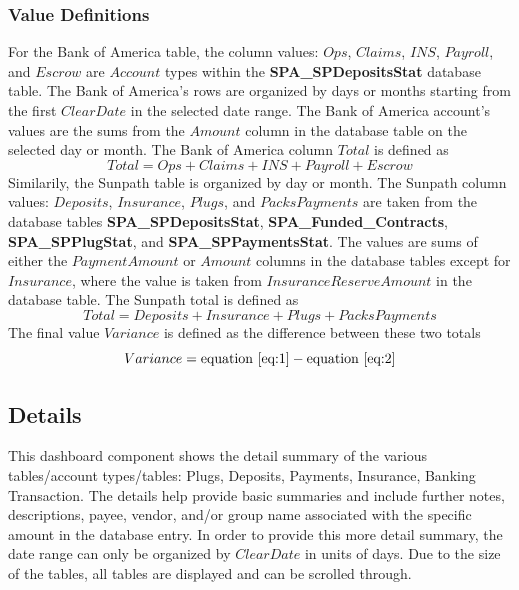 \documentclass[titlepage]{article}
\begin{document}
\subsubsection{Value Definitions}
For the Bank of America table, the column values: $Ops$, $Claims$, $INS$, $Payroll$, and $Escrow$ are $Account$ types within the \textbf{SPA\_SPDepositsStat} database table. The Bank of America's rows are organized by days or months starting from the first $Clear Date$ in the selected date range. The Bank of America account's values are the sums from the $Amount$ column in the database table on the selected day or month. The Bank of America column $Total$ is defined as 
\begin{equation} \label{eq:1}
Total = Ops + Claims + INS + Payroll + Escrow
\end{equation}
Similarily, the Sunpath table is organized by day or month. The Sunpath column values: $Deposits$, $Insurance$, $Plugs$, and $PacksPayments$ are taken from the database tables \textbf{SPA\_SPDepositsStat}, \textbf{SPA\_Funded\_Contracts}, \textbf{SPA\_SPPlugStat}, and \textbf{SPA\_SPPaymentsStat}. The values are sums of either the $PaymentAmount$ or $Amount$ columns in the database tables except for $Insurance$, where the value is taken from $InsuranceReserveAmount$ in the database table. The Sunpath total is defined as 
\begin{equation}\label{eq:2}
Total = Deposits + Insurance + Plugs + Packs Payments
\end{equation}
The final value $Variance$ is defined as the difference between these two totals
\begin{equation}
Variance = \text{equation \ref{eq:1}} - \text{equation  \ref{eq:2}}
\end{equation}

\subsection{Details}\label{adminbankdetail}
This dashboard component shows the detail summary of the various tables/account types/tables: Plugs, Deposits, Payments, Insurance, Banking Transaction. The details help provide basic summaries and include further notes, descriptions, payee, vendor, and/or group name associated with the specific amount in the database entry. In order to provide this more detail summary, the date range can only be organized by $ClearDate$ in units of days. Due to the size of the tables, all tables are displayed and can be scrolled through. 
\end{document}
